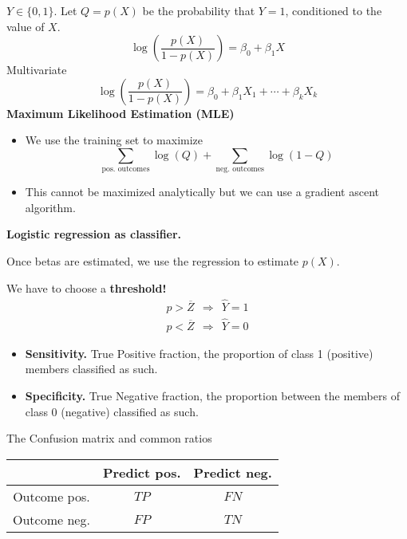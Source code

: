 
$Y\in \{0,1\}$. Let $Q=p\left( X\right)$ be the probability that $Y=1$, conditioned to the value of $X$.
\begin{equation*}
    \log\left(\frac{p\left( X\right)}{1-p\left( X\right)}\right) =\beta _{0} +\beta _{1} X
\end{equation*}
Multivariate
\begin{equation*}
    \log\left(\frac{p( X)}{1-p( X)}\right) =\beta _{0} +\beta _{1} X_{1} +\cdots +\beta _{k} X_{k}
\end{equation*}
\textbf{Maximum Likelihood Estimation (MLE)}
\begin{itemize}
    \item We use the training set to maximize
          \begin{equation*}
              \sum _{\text{pos. outcomes}}\log( Q) +\sum _{\text{neg. outcomes}}\log( 1-Q)
          \end{equation*}
    \item This cannot be maximized analytically but we can use a gradient ascent algorithm.
\end{itemize}

\textbf{Logistic regression as classifier.}

Once betas are estimated, we use the regression to estimate $p\left( X\right)$.

We have to choose a \textbf{threshold!}
\begin{gather*}
    p >\overline{Z} \ \ \Longrightarrow \ \ \hat{Y} =1\\
    p< \overline{Z} \ \ \Longrightarrow \ \ \hat{Y} =0
\end{gather*}

\begin{itemize}
    \item \textbf{Sensitivity.} True Positive fraction, the proportion of class 1 (positive) members classified as such.
    \item \textbf{Specificity.} True Negative fraction, the proportion between the members of class 0 (negative) classified as such.
\end{itemize}

The Confusion matrix and common ratios

\begin{center}
    
    \begin{tabular}{|c|c|c|}
        \hline 
                     & Predict pos. & Predict neg. \\
        \hline 
        Outcome pos. & $TP$         & $FN$         \\
        \hline 
        Outcome neg. & $FP$         & $TN$         \\
        \hline
    \end{tabular}
\end{center}

